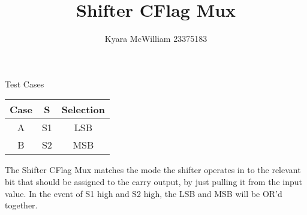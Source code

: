 \documentclass{article}
\title{Shifter CFlag Mux}
\author{Kyara McWilliam 23375183}
\date{}
\begin{document}
\maketitle

Test Cases
\hfill \break

\begin{tabular}{ |c|c|c| }
\hline
Case & S & Selection \\
\hline
A & S1 & LSB \\
B & S2 & MSB \\
\hline
\end{tabular}
\hfill \break \break
The Shifter CFlag Mux matches the mode the shifter operates in to the relevant bit that should be assigned to the carry output, by just pulling it from the input value. In the event of S1 high and S2 high, the LSB and MSB will be OR'd together.
\end{document}
